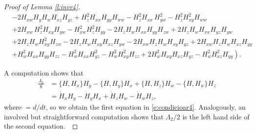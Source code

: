 \documentclass[10pt,a4paper]{amsart}
\begin{document}
\begin{proof}[Proof of Lemma \ref{l:invr4}]
\begin{align*}
& -2 H_{xw} H_{y} H_{w} H_{xz} H_{yz} + H_{z}^{2} H_{xx} H_{yy} H_{ww}- H_{z}^{2} H_{xx} \,H_{yw}^{2}- H_{z}^{2} H_{xy}^{2} H_{ww} \\
&+2 H_{xw} \,H_{z}^{2} H_{xy} H_{yw} - H_{xw}^{2} H_{z}^{2} H_{yy}-2 H_{z} H_{w} H_{xx} H_{yy} H_{zw} +2 H_{z} H_{w} H_{xx} H_{yz} H_{yw} \\
 &+2 H_{z} H_{w} H_{xy}^{2} H_{zw} -2 H_{z} H_{w} H_{xy} H_{xz} H_{yw}-2 H_{xw} H_{z} H_{w} H_{xy} H_{yz} +2 H_{xw} H_{z} H_{w} H_{xz} H_{yy} \\
 &\left.+ H_{w}^{2} H_{xx} H_{yy} H_{zz} - H_{w}^{2} H_{xx} H_{yz}^{2}- H_{w}^{2} H_{xy}^{2} H_{zz} +2 H_{w}^{2} H_{xy} H_{xz} H_{yz} - H_{w}^{2} H_{xz}^{2} H_{yy}\right).
\end{align*}

A computation shows that
\begin{align*}
  \frac{\Lambda_0}{8}&=\{H,H_x\}H_y-\{H,H_y\}H_x+\{H,H_z\}H_w-\{H,H_w\}H_z\\
  &=\dot{H}_xH_y-\dot{H}_yH_x+\dot{H}_zH_w-\dot{H}_wH_z,
\end{align*}
where $\dot{}=d/dt$, so we obtain the first equation in \eqref{e:condicioar4}.
Analogously, an involved but straightforward computation shows that
  $\Lambda_2/2$ is the left hand side of the second equation.~\end{proof}
\end{document}
